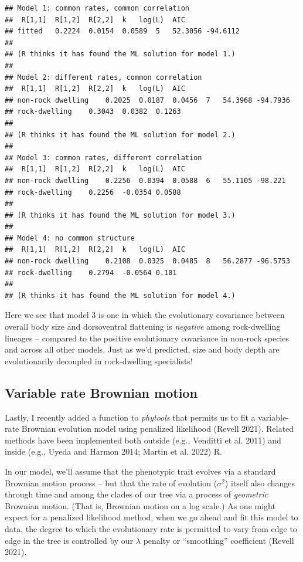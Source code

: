 \documentclass[fleqn,10pt,lineno]{wlpeerj} %
\begin{document}
\begin{verbatim}
## Model 1: common rates, common correlation 
##  R[1,1]  R[1,2]  R[2,2]  k   log(L)  AIC
## fitted   0.2224  0.0154  0.0589  5   52.3056 -94.6112    
## 
## (R thinks it has found the ML solution for model 1.)
## 
## Model 2: different rates, common correlation
##  R[1,1]  R[1,2]  R[2,2]  k   log(L)  AIC
## non-rock dwelling    0.2025  0.0187  0.0456  7   54.3968 -94.7936    
## rock-dwelling    0.3043  0.0382  0.1263  
## 
## (R thinks it has found the ML solution for model 2.)
## 
## Model 3: common rates, different correlation
##  R[1,1]  R[1,2]  R[2,2]  k   log(L)  AIC
## non-rock dwelling    0.2256  0.0394  0.0588  6   55.1105 -98.221 
## rock-dwelling    0.2256  -0.0354 0.0588  
## 
## (R thinks it has found the ML solution for model 3.)
## 
## Model 4: no common structure
##  R[1,1]  R[1,2]  R[2,2]  k   log(L)  AIC
## non-rock dwelling    0.2108  0.0325  0.0485  8   56.2877 -96.5753    
## rock-dwelling    0.2794  -0.0564 0.101   
## 
## (R thinks it has found the ML solution for model 4.)
\end{verbatim}

Here we see that model 3 is one in which the evolutionary covariance between overall body size and dorsoventral flattening is \emph{negative} among rock-dwelling lineages -- compared to the positive evolutionary covariance in non-rock species and across all other models. Just as we'd predicted, size and body depth are evolutionarily decoupled in rock-dwelling specialists!

\hypertarget{variable-rate-brownian-motion}{%
\subsection{Variable rate Brownian motion}\label{variable-rate-brownian-motion}}

Lastly, I recently added a function to \emph{phytools} that permits us to fit a variable-rate Brownian evolution model using penalized likelihood (Revell 2021). Related methods have been implemented both outside (e.g., Venditti et al. 2011) and inside (e.g., Uyeda and Harmon 2014; Martin et al. 2022) R.

In our model, we'll assume that the phenotypic trait evolves via a standard Brownian motion process -- but that the rate of evolution (\(\sigma^{2}\)) itself also changes through time and among the clades of our tree via a process of \emph{geometric} Brownian motion. (That is, Brownian motion on a log scale.) As one might expect for a penalized likelihood method, when we go ahead and fit this model to data, the degree to which the evolutionary rate is permitted to vary from edge to edge in the tree is controlled by our \(\lambda\) penalty or ``smoothing'' coefficient (Revell 2021).
\end{document}
